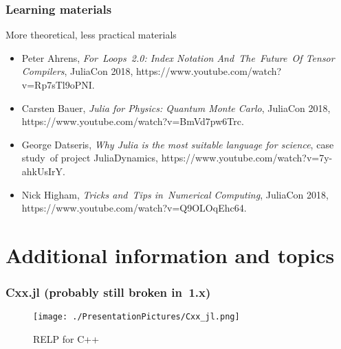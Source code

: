 \documentclass[10pt,t]{beamer}
\begin{document}
\begin{frame}
  \frametitle{Learning materials}


  {More theoretical, less practical materials}
  \begin{itemize}

  \item Peter Ahrens, \emph{For~Loops~2.0: Index Notation
      And~The~Future~Of Tensor Compilers}, JuliaCon 2018,
    {https://www.youtube.com/watch?v=Rp7sTl9oPNI}.

  \item Carsten Bauer, \emph{Julia for Physics: Quantum Monte
      Carlo}, JuliaCon 2018,
    {https://www.youtube.com/watch?v=BmVd7pw6Trc}.

  \item George Datseris, \emph{Why Julia is the most suitable
      language for science}, case study~of project JuliaDynamics,
    {https://www.youtube.com/watch?v=7y-ahkUsIrY}.

  \item Nick Higham, \emph{Tricks and~Tips in~Numerical
      Computing}, JuliaCon 2018,
    {https://www.youtube.com/watch?v=Q9OLOqEhc64}.

  \end{itemize}

\end{frame}










\section[]{Additional information and topics}



\begin{frame}
  \frametitle{Cxx.jl (probably still broken in~1.x)}


  \begin{figure}

    \centering

    \texttt{[image: ./PresentationPictures/Cxx\_jl.png]}


    \caption{RELP for C++}

  \end{figure}

\end{frame}
\end{document}
